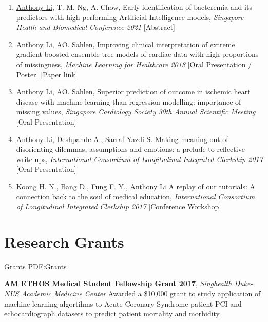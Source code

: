 \documentclass[letterpaper,10pt,oneside]{article}
\begin{document}
\begin{body}
\begin{enumerate}
\item \underline{Anthony Li}, T. M. Ng, A. Chow, \textcolor{mygray}{Early identification of bacteremia and its predictors with high performing Artificial Intelligence models}, \textit{Singapore Health and Biomedical Conference 2021} [Abstract]

\item \underline{Anthony Li}, AO. Sahlen, \textcolor{mygray}{Improving clinical interpretation of extreme gradient boosted ensemble tree models of cardiac data with high proportions of missingness}, \textit{Machine Learning for Healthcare 2018} [Oral Presentation / Poster] [\href{https://static1.squarespace.com/static/59d5ac1780bd5ef9c396eda6/t/5b737a45032be4fab007b259/1534294605515/Li_A}{Paper link}]

\item \underline{Anthony Li}, AO. Sahlen, \textcolor{mygray}{Superior prediction of outcome in ischemic heart disease with machine learning than regression modelling: importance of missing values}, \textit{Singapore Cardiology Society 30th Annual Scientific Meeting}
[Oral Presentation]

\item \underline{Anthony Li}, Deshpande A., Sarraf-Yazdi S. \textcolor{mygray}{Making meaning out of disorienting dilemmas, assumptions and emotions: a prelude to reflective write-ups}, \textit{International Consortium of Longitudinal Integrated Clerkship 2017}
[Oral Presentation]

\item Koong H. N., Bang D., Fung F. Y., \underline{Anthony Li} \textcolor{mygray}{A replay of our tutorials: A connection back to the soul of medical education}, \textit{International Consortium of Longitudinal Integrated Clerkship 2017}
[Conference Workshop]

\end{enumerate}


\section
{Research Grants}
{Grants}
{PDF:Grants}

\textbf{AM ETHOS Medical Student Fellowship Grant 2017},
\hfill{}
\GapNoBreak
\textit{Singhealth Duke-NUS Academic Medicine Center}
\GapNoBreak
\BulletItem
Awarded a \$10,000 grant to study application of machine learning algortihms to Acute Coronary Syndrome patient PCI and echocardiograph datasets to predict patient mortality and morbidity.
\GapNoBreak




\end{body}
\end{document}
